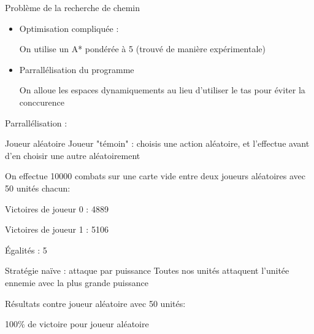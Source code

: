 \documentclass[french]{beamer}
\begin{document}
\begin{frame}{Problème de la recherche de chemin}
	\begin{itemize}
		\item Optimisation compliquée :
		
		On utilise un A* pondérée à 5 (trouvé de manière expérimentale)
		
		\item Parrallélisation du programme
		
		On alloue les espaces dynamiquements au lieu d'utiliser le tas pour éviter la conccurence
	\end{itemize}
Parrallélisation :
\begin{center}
\end{center}

\end{frame}
\begin{frame}{Joueur aléatoire}
	Joueur "témoin" : choisis une action aléatoire, et l'effectue avant d'en choisir une autre aléatoirement
	\vspace*{1em}
	
	On effectue 10000 combats sur une carte vide entre deux joueurs aléatoires avec 50 unités chacun:
	\vspace*{1em}
	
	Victoires de joueur 0 : 4889
	
	Victoires de joueur 1 : 5106
	
	Égalités : 5
\end{frame}
\begin{frame}{Stratégie naïve : attaque par puissance}
	Toutes nos unités attaquent l'unitée ennemie avec la plus grande puissance
	
	Résultats contre joueur aléatoire avec 50 unités:
	
	100\% de victoire pour joueur aléatoire
\end{frame}
\end{document}
